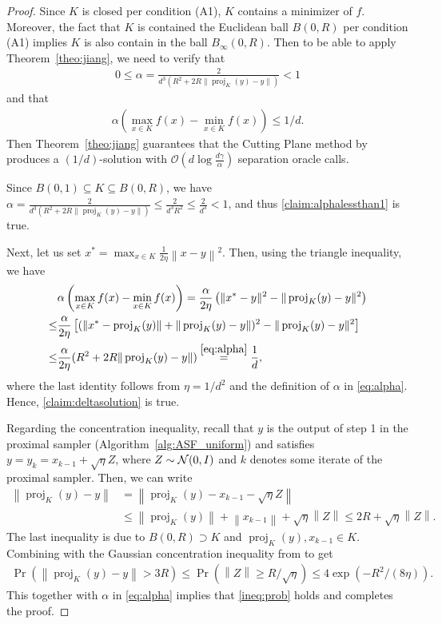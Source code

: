 \documentclass[11pt,letterpaper]{article}
\newcommand{\norm}[1]{\left\lVert #1 \right\rVert}
\newcommand{\proj}{\operatorname{proj}}
\newcommand{\brac}[1]{\left( #1\right)}
\begin{document}
\begin{proof}
Since $K$ is closed per condition (A1), $K$ contains a minimizer of $f$. Moreover, the fact that $K$ is contained the Euclidean ball $B(0,R)$ per condition (A1) implies $K$ is also contain in the ball $B_\infty(0,R)$. Then to be able to apply Theorem~\ref{theo:jiang}, we need to verify that 
\begin{align}
\label{claim:alphalessthan1}
    0\leq \alpha= \frac{2}{d^3\brac{R^2 + 2R\|\proj_K(y)-y\|}}<1
\end{align}
and that
\begin{align}
\label{claim:deltasolution}
   \alpha \left(\max_{x \in K} f(x)-\min_{x \in K} f(x)\right) \le 1/d. 
\end{align}
Then Theorem~\ref{theo:jiang} guarantees that the Cutting Plane method by \cite{jiang2020cuttingplane} produces a $(1/d)$-solution with $\mathcal{O}\brac{d \log \frac{d \gamma}{\alpha}}$ separation oracle calls. 


Since $B(0,1) \subseteq K \subseteq B(0,R)$, we have $\alpha = \frac{2 }{d^3\brac{R^2 + 2R\|\proj_K(y)-y\|}} \le \frac{2}{d^3 R^2} \le \frac{2}{d^3} < 1$,
and thus \eqref{claim:alphalessthan1} is true. 

Next, let us set $x^*=\max_{x\in K} \frac{1}{2\eta}\norm{x-y}^2$. Then, using the triangle inequality, we have
\begin{align*}
     &\alpha \left(\max_{x \in K} f(x)-\min_{x \in K} f(x)\right)= \frac{\alpha}{2\eta} \left(\|x^* - y\|^2 - \|\proj_K(y) - y\|^2\right)\\
    \le& \frac{\alpha}{2\eta} \left[(\|x^* - \proj_K(y)\| + \|\proj_K(y) - y\|)^2 - \|\proj_K(y) - y\|^2\right]\\
    \le& \frac{\alpha}{2\eta} (R^2 + 2R\|\proj_K(y) - y\|) \stackrel{\eqref{eq:alpha}}= \frac{1}{d},
\end{align*}
where the last identity follows from $\eta=1/d^2$ and the definition of $\alpha$ in \eqref{eq:alpha}. Hence, \eqref{claim:deltasolution} is true. 

Regarding the concentration inequality, recall that $y$ is the output of step 1 in the proximal sampler (Algorithm~\ref{alg:ASF_uniform}) and satisfies $ y=y_k=x_{k-1} +\sqrt{\eta}Z$, where $Z\sim {\cal N}(0,I)$ and $k$ denotes some iterate of the proximal sampler. Then, we can write
\begin{align*}
   \norm{\proj_K(y)-y}&=\norm{\proj_K(y)-x_{k-1}-\sqrt{\eta}Z}\\
   &\leq \norm{\proj_K(y)}+\norm{x_{k-1}}+\sqrt{\eta}\norm{Z}\leq 2R+\sqrt{\eta}\norm{Z}. 
\end{align*}
The last inequality is due to $B(0,R) \supset K$ and $\proj_K(y),x_{k-1}\in K$. Combining with the Gaussian concentration inequality from \cite[Equation (3.5)]{ledoux2013probability} to get
\begin{align*}
    \Pr\brac{ \norm{\proj_K(y)-y}>3R}\leq \Pr\brac{\norm{Z}\geq R/\sqrt{\eta}}\leq 4\exp\brac{-R^2/(8\eta)}. 
\end{align*}
This together with $\alpha$ in \eqref{eq:alpha} implies that \eqref{ineq:prob} holds and completes the proof. 
\end{proof}
\end{document}
